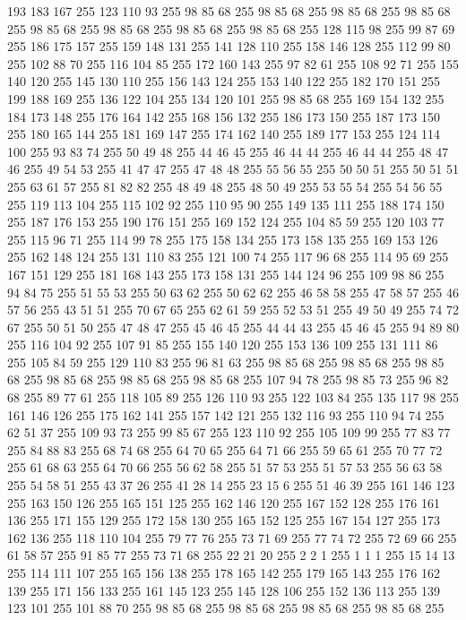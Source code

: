 193 183 167 255 123 110 93 255 98 85 68 255 98 85 68 255 98 85 68 255 98 85 68 255 98 85 68 255 98 85 68 255 98 85 68 255 98 85 68 255 128 115 98 255 99 87 69 255 186 175 157 255 159 148 131 255 141 128 110 255 158 146 128 255 112 99 80 255 102 88 70 255 116 104 85 255 172 160 143 255 97 82 61 255 108 92 71 255 155 140 120 255 145 130 110 255 156 143 124 255 153 140 122 255 182 170 151 255 199 188 169 255 136 122 104 255 134 120 101 255 98 85 68 255 169 154 132 255 184 173 148 255 176 164 142 255 168 156 132 255 186 173 150 255 187 173 150 255 180 165 144 255 181 169 147 255 174 162 140 255 189 177 153 255 124 114 100 255 93 83 74 255 50 49 48 255 44 46 45 255 46 44 44 255 46 44 44 255 48 47 46 255 49 54 53 255 41 47 47 255 47 48 48 255 55 56 55 255 50 50 51 255 50 51 51 255 63 61 57 255 81 82 82 255 48 49 48 255 48 50 49 255 53 55 54 255 54 56 55 255 119 113 104 255 115 102 92 255 110 95 90 255 149 135 111 255
188 174 150 255 187 176 153 255 190 176 151 255 169 152 124 255 104 85 59 255 120 103 77 255 115 96 71 255 114 99 78 255 175 158 134 255 173 158 135 255 169 153 126 255 162 148 124 255 131 110 83 255 121 100 74 255 117 96 68 255 114 95 69 255 167 151 129 255 181 168 143 255 173 158 131 255 144 124 96 255 109 98 86 255 94 84 75 255 51 55 53 255 50 63 62 255 50 62 62 255 46 58 58 255 47 58 57 255 46 57 56 255 43 51 51 255 70 67 65 255 62 61 59 255 52 53 51 255 49 50 49 255 74 72 67 255 50 51 50 255 47 48 47 255 45 46 45 255 44 44 43 255 45 46 45 255 94 89 80 255 116 104 92 255 107 91 85 255 155 140 120 255 153 136 109 255 131 111 86 255 105 84 59 255 129 110 83 255 96 81 63 255 98 85 68 255 98 85 68 255 98 85 68 255 98 85 68 255 98 85 68 255 98 85 68 255 107 94 78 255 98 85 73 255 96 82 68 255 89 77 61 255 118 105 89 255 126 110 93 255 122 103 84 255 135 117 98 255 161 146 126 255 175 162 141 255
157 142 121 255 132 116 93 255 110 94 74 255 62 51 37 255 109 93 73 255 99 85 67 255 123 110 92 255 105 109 99 255 77 83 77 255 84 88 83 255 68 74 68 255 64 70 65 255 64 71 66 255 59 65 61 255 70 77 72 255 61 68 63 255 64 70 66 255 56 62 58 255 51 57 53 255 51 57 53 255 56 63 58 255 54 58 51 255 43 37 26 255 41 28 14 255 23 15 6 255 51 46 39 255 161 146 123 255 163 150 126 255 165 151 125 255 162 146 120 255 167 152 128 255 176 161 136 255 171 155 129 255 172 158 130 255 165 152 125 255 167 154 127 255 173 162 136 255 118 110 104 255 79 77 76 255 73 71 69 255 77 74 72 255 72 69 66 255 61 58 57 255 91 85 77 255 73 71 68 255 22 21 20 255 2 2 1 255 1 1 1 255 15 14 13 255 114 111 107 255 165 156 138 255 178 165 142 255 179 165 143 255 176 162 139 255 171 156 133 255 161 145 123 255 145 128 106 255 152 136 113 255 139 123 101 255 101 88 70 255 98 85 68 255 98 85 68 255 98 85 68 255 98 85 68 255
